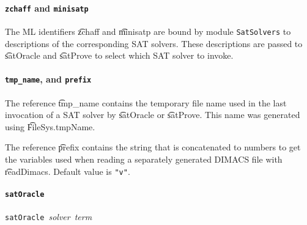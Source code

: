 \paragraph{{\tt zchaff} and {\tt minisatp}}${}$\\

The ML identifiers \t{zchaff} and \t{minisatp} are bound
by module {\tt SatSolvers} to descriptions of the corresponding SAT solvers.
These descriptions are passed to \t{satOracle} and \t{satProve} to
select which SAT solver to invoke.

\paragraph{{\tt tmp\_name}, and {\tt prefix}}${}$\\

The reference \t{tmp\_name} contains the temporary file name used in
the last invocation of a SAT solver  by \t{satOracle} or \t{satProve}. This name
was generated using \t{FileSys.tmpName}.

The reference \t{prefix} contains the string that is concatenated to numbers
to get the \HOL{} variables used when reading a separately generated DIMACS file
with \t{readDimacs}. Default value is {\verb+"v"+}.

\paragraph{\tt satOracle}${}$\\
{\small{\tt satOracle}~{\it solver}~{\it term}}


